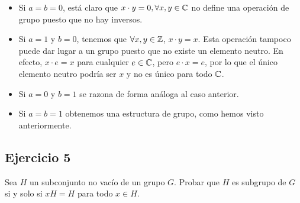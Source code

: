 \documentclass{article}
\begin{document}
\begin{itemize}
\item Si $\displaystyle a = b = 0 $, está claro que $\displaystyle x \cdot y = 0 , \forall x,y \in \mathbb{C}$ no define una operación de grupo puesto que no hay inversos.
\item Si $\displaystyle a = 1 $ y $\displaystyle b =0 $, tenemos que $\displaystyle \forall x,y \in \mathbb{Z} $, $\displaystyle x \cdot y = x $. Esta operación tampoco puede dar lugar a un grupo puesto que no existe un elemento neutro. En efecto, $\displaystyle x \cdot e = x $ para cualquier $\displaystyle e \in \mathbb{C} $, pero $\displaystyle e \cdot x = e $, por lo que el único elemento neutro podría ser $\displaystyle x $ y no es único para todo $\displaystyle \mathbb{C} $.
\item Si $\displaystyle a = 0 $ y $\displaystyle b = 1 $ se razona de forma análoga al caso anterior.
\item Si $\displaystyle a = b = 1 $ obtenemos una estructura de grupo, como hemos visto anteriormente.
\end{itemize}

\subsection*{Ejercicio 5}
Sea $\displaystyle H $ un subconjunto no vacío de un grupo $\displaystyle G $. Probar que $\displaystyle H $ es subgrupo de $\displaystyle G $ si y solo si $\displaystyle xH = H $ para todo $\displaystyle x \in H $.
\end{document}

